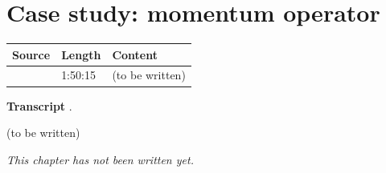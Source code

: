 \chapter{Case study: momentum operator}\label{ch:c29}
\begin{paracol}{2}

\begin{sources}
\begin{tabularx}{\linewidth}{@{}l l L@{}}
\toprule
\textbf{Source} & \textbf{Length} & \textbf{Content}\\
\midrule
{} & 1:50:15 & (to be written)\\
\bottomrule
\end{tabularx}

\smallskip
\textbf{Transcript} .
\end{sources}

\begin{reading}
(to be written)
\end{reading}

\emph{This chapter has not been written yet.}

\flushside
\end{paracol}
